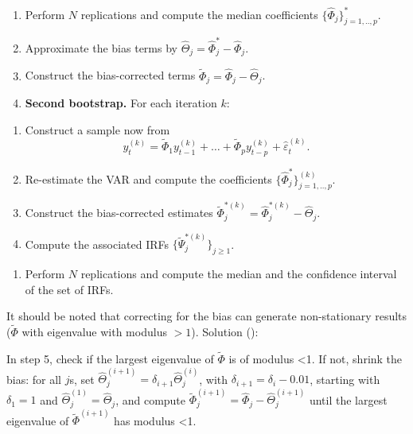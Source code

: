 \documentclass[
  12pt,
]{book}
\providecommand{\tightlist}{%
  \setlength{\itemsep}{0pt}\setlength{\parskip}{0pt}}
\theoremstyle{definition}
\theoremstyle{definition}
\theoremstyle{definition}
\theoremstyle{definition}
\theoremstyle{remark}
\begin{document}
\begin{enumerate}
\def\labelenumi{\arabic{enumi}.}
\setcounter{enumi}{2}
\tightlist
\item
  Perform \(N\) replications and compute the median coefficients \(\{\widehat{\Phi}_j\}_{j=1,..,p}^*\).
\item
  Approximate the bias terms by \(\widehat{\Theta}_j=\widehat{\Phi}_j^*-\widehat{\Phi}_j\).
\item
  Construct the bias-corrected terms \(\widetilde{\Phi}_j=\widehat{\Phi}_j-\widehat{\Theta}_j\).
\item
  \textbf{Second bootstrap.} For each iteration \(k\):
\end{enumerate}

\begin{enumerate}
\def\labelenumi{\alph{enumi}.}
\tightlist
\item
  Construct a sample now from
  \[
  y_t^{(k)}=\widetilde{\Phi}_1 y_{t-1}^{(k)} + \dots + \widetilde{\Phi}_p y_{t-p}^{(k)} + \hat\varepsilon_t^{(k)}.
  \]
\item
  Re-estimate the VAR and compute the coefficients \(\{\widehat{\Phi}^*_j\}_{j=1,..,p}^{(k)}\).
\item
  Construct the bias-corrected estimates \(\widetilde{\Phi}_j^{*(k)}=\widehat{\Phi}_j^{*(k)}-\widehat{\Theta}_j\).
\item
  Compute the associated IRFs \(\{\widetilde{\Psi}_j^{*(k)}\}_{j\ge 1}\).
\end{enumerate}

\begin{enumerate}
\def\labelenumi{\arabic{enumi}.}
\setcounter{enumi}{6}
\tightlist
\item
  Perform \(N\) replications and compute the median and the confidence interval of the set of IRFs.
\end{enumerate}

It should be noted that correcting for the bias can generate non-stationary results (\(\tilde \Phi\) with eigenvalue with modulus \(>1\)). Solution (\citet{Kilian_1998}):

In step 5, check if the largest eigenvalue of \(\tilde\Phi\) is of modulus \textless1.
If not, shrink the bias: for all \(j\)s, set \(\widehat{\Theta}_j^{(i+1)}=\delta_{i+1}\widehat{\Theta}_j^{(i)}\), with \(\delta_{i+1}=\delta_i-0.01\), starting with \(\delta_1=1\) and \(\widehat{\Theta}_j^{(1)} =\widehat{\Theta}_j\), and compute \(\widetilde{\Phi}_j^{(i+1)}=\widehat{\Phi}_j-\widehat{\Theta}_j^{(i+1)}\) until the largest eigenvalue of \(\tilde\Phi^{(i+1)}\) has modulus \textless1.
\end{document}
